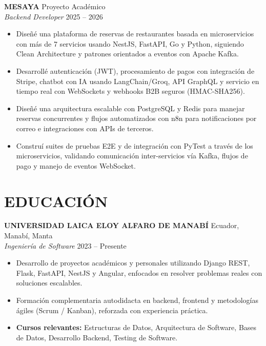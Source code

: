 \documentclass[11pt, a4paper]{article}
\begin{document}
\vspace{4pt}

\textbf{MESAYA} \hfill Proyecto Académico \\
\textit{Backend Developer} \hfill 2025 -- 2026

\begin{itemize}
\item Diseñé una plataforma de reservas de restaurantes basada en microservicios con más de 7 servicios usando NestJS, FastAPI, Go y Python, siguiendo Clean Architecture y patrones orientados a eventos con Apache Kafka.
\item Desarrollé autenticación (JWT), procesamiento de pagos con integración de Stripe, chatbot con IA usando LangChain/Groq, API GraphQL y servicio en tiempo real con WebSockets y webhooks B2B seguros (HMAC-SHA256).
\item Diseñé una arquitectura escalable con PostgreSQL y Redis para manejar reservas concurrentes y flujos automatizados con n8n para notificaciones por correo e integraciones con APIs de terceros.
\item Construí suites de pruebas E2E y de integración con PyTest a través de los microservicios, validando comunicación inter-servicios vía Kafka, flujos de pago y manejo de eventos WebSocket.
\end{itemize}

\section*{EDUCACIÓN}

\textbf{UNIVERSIDAD LAICA ELOY ALFARO DE MANABÍ} \hfill Ecuador, Manabí, Manta \\
\textit{Ingeniería de Software} \hfill 2023 -- Presente

\begin{itemize}
\item Desarrollo de proyectos académicos y personales utilizando Django REST, Flask, FastAPI, NestJS y Angular, enfocados en resolver problemas reales con soluciones escalables.
\item Formación complementaria autodidacta en backend, frontend y metodologías ágiles (Scrum / Kanban), reforzada con experiencia práctica.
\item \textbf{Cursos relevantes:} Estructuras de Datos, Arquitectura de Software, Bases de Datos, Desarrollo Backend, Testing de Software.
\end{itemize}
\end{document}
